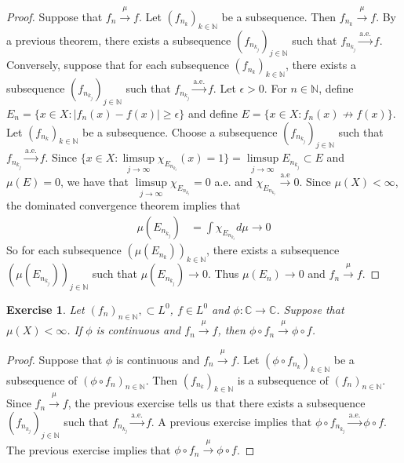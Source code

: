 \documentclass[12pt]{amsart}
\newtheorem{ex}[thm]{Exercise}
\newcommand{\ep}{\epsilon}
\newcommand{\C}{\mathbb{C}}
\newcommand{\N}{\mathbb{N}}
\newcommand{\convt}[1]{\xrightarrow{\text{#1}}}
\newcommand{\conv}[1]{\xrightarrow{#1}}
\begin{document}
\begin{proof}
	Suppose that $f_n \conv{\mu} f$. Let $(f_{n_k})_{k \in \N}$ be a subsequence. Then $f_{n_k} \conv{\mu} f$. By a previous theorem, there exists a subsequence $(f_{n_{k_j}})_{j \in \N}$ such that $f_{n_{k_j}} \convt{a.e.} f$. Conversely, suppose that for each subsequence $(f_{n_k})_{k \in \N}$, there exists a subsequence $(f_{n_{k_j}})_{j \in \N}$ such that $f_{n_{k_j}} \convt{a.e.} f$. Let $\ep >0$. For $n \in \N$, define $E_{n} = \{x \in X: |f_n(x) - f(x) | \geq \ep\}$ and define $E = \{x \in X: f_n(x) \not \rightarrow f(x)\}$. Let $(f_{n_k})_{k \in \N}$ be a subsequence. Choose a subsequence $(f_{n_{k_j}})_{j \in \N}$ such that $f_{n_{k_j}} \convt{a.e.} f$. Since $\bigg \{x \in X: \limsup\limits_{j \rightarrow \infty} \chi_{E_{n_{k_j}}}(x) = 1\bigg \} = \limsup\limits_{j \rightarrow \infty} E_{n_{k_j}} \subset E$ and $\mu(E) = 0$, we have that $\limsup\limits_{j \rightarrow \infty} \chi_{E_{n_{k_j}}} = 0$ a.e. and $\chi_{E_{n_{k_j}}} \convt{a.e} 0$. Since $\mu(X) < \infty$, the dominated convergence theorem implies that 
	\begin{align*}
		\mu(E_{n_{k_j}}) 
		&= \int \chi_{E_{n_{k_j}}} d \mu  \rightarrow 0
	\end{align*} 
	So for each subsequence $(\mu(E_{n_k}))_{k \in \N}$, there exists a subsequence $(\mu(E_{n_{k_j}}))_{j \in \N}$ such that $\mu(E_{n_{k_j}}) \rightarrow 0$. Thus $\mu(E_n) \rightarrow 0$ and $f_n \conv{\mu} f$.
\end{proof}

\begin{ex}
	Let $(f_n)_{n \in \N}, \subset L^0$, $f \in L^0$ and $\phi: \C \rightarrow \C$. Suppose that $\mu(X) < \infty$. If $\phi$ is continuous and $f_n \conv{\mu} f$, then $\phi \circ f_n \conv{\mu} \phi \circ f$.
\end{ex}

\begin{proof}
	Suppose that $\phi$ is continuous and $f_n \conv{\mu} f$. Let $(\phi \circ f_{n_k})_{k \in \N}$ be a subsequence of $(\phi \circ f_{n})_{n \in \N}$. Then $(f_{n_k})_{k \in \N}$ is a subsequence of $(f_{n})_{n \in \N}$. Since $f_n \conv{\mu} f$, the previous exercise tells us that there exists a subsequence $(f_{n_{k_j}})_{j \in \N}$ such that $f_{n_{k_j}} \convt{a.e.} f$. A previous exercise implies that $\phi \circ f_{n_{k_j}}\convt{a.e.} \phi \circ f$. The previous exercise implies that $\phi \circ f_{n}\conv{\mu} \phi \circ f$.
\end{proof}
\end{document}
